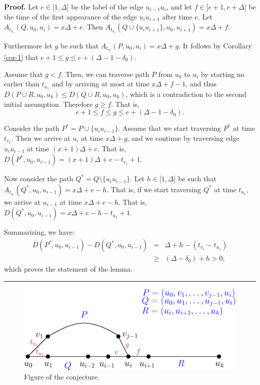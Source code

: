 \documentclass{article}
\newenvironment{proof}[1][Proof]{\noindent\textbf{#1.} }{\ \rule{0.5em}{0.5em}}
\begin{document}
\begin{proof}
Let $e\in \lbrack 1,\Delta ]$ be the label of the edge $u_{i-1}u_{i}$, and
let $f\in \lbrack e+1,e+\Delta ]$ be the time of the first appearance of the
edge $u_{i}u_{i+1}$ after time $e$.  Let $A_{t_{u_{i}}}(Q,u_{0},u_{i})=x%
\Delta +e$. Then $A_{t_{u_{i}}}(Q\cup
\{u_{i}u_{i+1}\},u_{0},u_{i+1})=x\Delta +f$. 

Furthermore let $g$ be such that $A_{t_{u_{i}}}(P,u_{0},u_{i})=x\Delta +g$.
It follows by Corollary \ref{cor-1} that $e+1\leq g\leq e+(\Delta -1-\delta
_{0})$.

Assume that $g<f$. Then, we can traverse path $P$ from $u_{0}$ to $u_{i}$ by
starting no earlier than $t_{u_{1}}$ and by arriving at most at time $%
x\Delta +f-1$, and thus $D(P\cup R,u_{0},u_{k})\leq D(Q\cup R,u_{0},u_{k})$,
which is a contradiction to the second initial assumption. Therefore $g\geq f
$. That is,%
\begin{equation}
e+1\leq f\leq g\leq e+(\Delta -1-\delta _{0}).  \label{basic-eq-2}
\end{equation}

Consider the path $P^{\ast }=P\cup \{u_{i}u_{i-1}\}$. Assume that we start
traversing $P^{\ast }$ at time $t_{v_{1}}$. Then we arrive at $u_{i}$ at
time $x\Delta +g$, and we continue by traversing edge $u_{i}u_{i-1}$ at time 
$(x+1)\Delta +e$. That is, $D(P^{\ast },u_{0},u_{i-1})=(x+1)\Delta
+e-t_{v_{1}}+1$.

Now consider the path $Q^{\ast }=Q\setminus \{u_{i}u_{i-1}\}$. Let $h\in
\lbrack 1,\Delta ]$ be such that $A_{t_{u_{i}}}(Q^{\ast},u_{0},u_{i-1})=x\Delta +e-h
$. That is, if we start traversing $Q^{\ast }$ at time $t_{u_{1}}$, we
arrive at $u_{i-1}$ at time $x\Delta +e-h$. That is, $D(Q^{\ast
},u_{0},u_{i-1})=x\Delta +e-h-t_{u_{1}}+1$.

Summarizing, we have:%
\begin{eqnarray*}
D(P^{\ast },u_{0},u_{i-1})-D(Q^{\ast },u_{0},u_{i-1}) &=&\Delta
+h-(t_{v_{1}}-t_{u_{1}}) \\
&\geq &(\Delta -\delta _{0})+h>0,
\end{eqnarray*}
which proves the statement of the lemma.
\end{proof}

\bigskip

\bigskip

\bigskip

\begin{figure}[htbp]
\centering
\includegraphics[width=0.6\linewidth]{conj-fig}
\caption{Figure of the conjecture.}
\label{conj-fig}
\end{figure}

%
%
%
%
\end{document}
